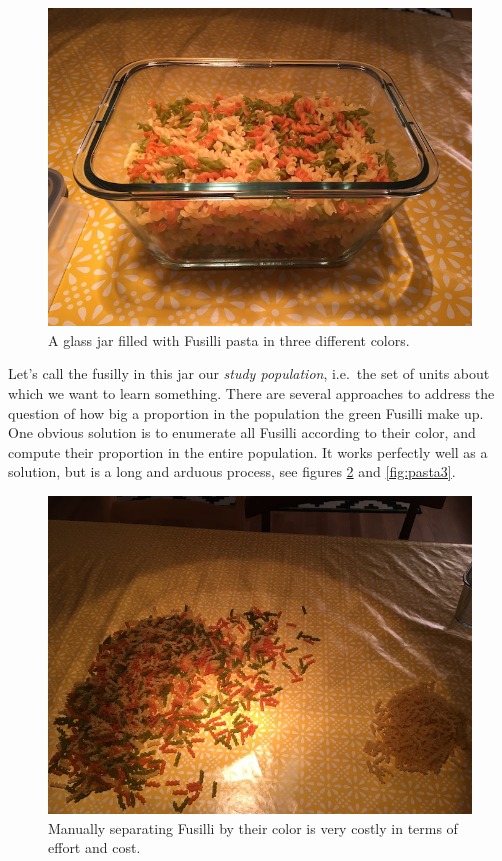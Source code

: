 \documentclass[]{book}
\begin{document}
\begin{figure}

{\centering \includegraphics[width=0.9\linewidth]{images/pasta1} 

}

\caption{A glass jar filled with Fusilli pasta in three different colors.}\label{fig:pasta1}
\end{figure}

Let's call the fusilly in this jar our \emph{study population}, i.e.~the set of units about which we want to learn something. There are several approaches to address the question of how big a proportion in the population the green Fusilli make up. One obvious solution is to enumerate all Fusilli according to their color, and compute their proportion in the entire population. It works perfectly well as a solution, but is a long and arduous process, see figures \ref{fig:pasta2} and \ref{fig:pasta3}.

\begin{figure}

{\centering \includegraphics[width=0.9\linewidth]{images/pasta2} 

}

\caption{Manually separating Fusilli by their color is very costly in terms of effort and cost.}\label{fig:pasta2}
\end{figure}
\end{document}
